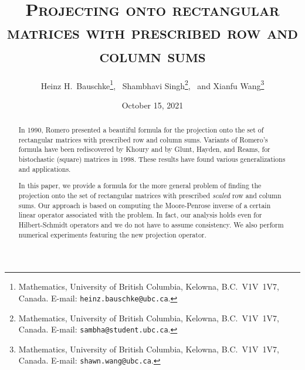 \documentclass[12pt]{article}
\theoremstyle{definition}
\begin{document}
\title{\textsc{
Projecting onto rectangular matrices with 
prescribed row and column sums
}}

\author{
Heinz H.\ Bauschke\thanks{
Mathematics, University
of British Columbia,
Kelowna, B.C.\ V1V~1V7, Canada. E-mail:
\texttt{heinz.bauschke@ubc.ca}.},~
Shambhavi Singh\thanks{
Mathematics, University
of British Columbia,
Kelowna, B.C.\ V1V~1V7, Canada. E-mail:
\texttt{sambha@student.ubc.ca}.},~ 
and
Xianfu Wang\thanks{
Mathematics, University
of British Columbia,
Kelowna, B.C.\ V1V~1V7, Canada. E-mail:
\texttt{shawn.wang@ubc.ca}.}
}

\date{October 15, 2021} 


\maketitle



\vskip 8mm

\begin{abstract}
{ 
In 1990, Romero presented a beautiful formula for the projection 
onto the set of rectangular matrices with prescribed row and column sums. 
Variants of Romero's formula have been rediscovered by 
Khoury and by Glunt, Hayden, and Reams, for bistochastic (square) matrices
in 1998. 
These results have
found various generalizations and applications. 
}

In this paper, we provide a formula for the more general problem of finding the projection onto the set of 
rectangular matrices with prescribed \emph{scaled} row and column sums. 
Our approach is based on computing the Moore-Penrose inverse of a certain linear operator associated with the problem. In fact, our analysis holds even for Hilbert-Schmidt operators 
{  and we do not have to assume consistency}. We also perform  
numerical experiments featuring the new projection operator. 
\end{abstract}
\end{document}
